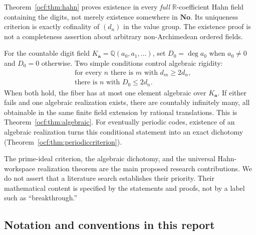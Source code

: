 \documentclass[11pt,a4paper]{article}
\numberwithin{equation}{section}
\theoremstyle{definition}
\theoremstyle{remark}
\newcommand{\No}{\mathbf{No}}
\newcommand{\R}{\mathbb R}
\newcommand{\Q}{\mathbb Q}
\newcommand{\dgr}{\operatorname{deg}}
\newcommand{\codea}{\boldsymbol a}
\begin{document}
Theorem~\ref{ocf:thm:hahn} proves existence in every \emph{full}
$\R$-coefficient Hahn field containing the digits, not merely existence
somewhere in $\No$. Its uniqueness criterion is exactly cofinality of
$(d_n)$ in the value group. The existence proof is not a completeness
assertion about arbitrary non-Archimedean ordered fields.

For the countable digit field $K_{\codea}=\Q(a_0,a_1,\ldots)$, set
$D_0=\dgr a_0$ when $a_0\ne0$ and $D_0=0$ otherwise. Two simple conditions
control algebraic rigidity:
\begin{align}
 &\text{for every }n\text{ there is }m\text{ with }d_m\ge2d_n,
    \tag{P}\label{ocf:cond:P}\\
 &\text{there is }n\text{ with }D_0\le2d_n.
    \tag{V}\label{ocf:cond:V}
\end{align}
When both hold, the fiber has at most one element algebraic over
$K_{\codea}$. If either fails and one algebraic realization exists, there are
countably infinitely many, all obtainable in the same finite field
extension by rational translations. This is
Theorem~\ref{ocf:thm:algebraic}. For eventually periodic codes, existence of an
algebraic realization turns this conditional statement into an exact
dichotomy (Theorem~\ref{ocf:thm:periodiccriterion}).

The prime-ideal criterion, the algebraic dichotomy, and the universal
Hahn-workspace realization theorem are the main proposed research
contributions. We do not assert that a literature search establishes their
priority. Their mathematical content is specified by the statements and
proofs, not by a label such as ``breakthrough.''

\subsection{Notation and conventions in this report}
\label{ocf:sec:conventions}
\end{document}
